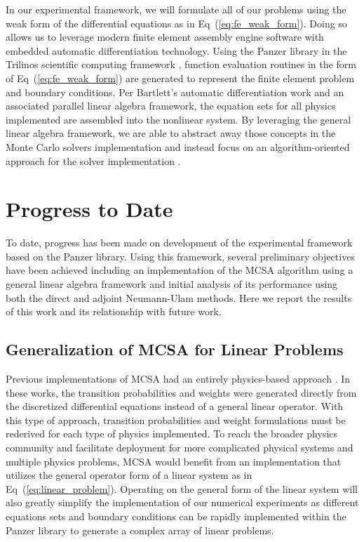 In our experimental framework, we will formulate all of our problems
using the weak form of the differential equations as in
Eq~(\ref{eq:fe_weak_form}). Doing so allows us to leverage modern
finite element assembly engine software with embedded automatic
differentiation technology. Using the Panzer library in the Trilinos
scientific computing framework
\citep{notz_graph-based_2010,heroux_overview_2005}, function
evaluation routines in the form of Eq~(\ref{eq:fe_weak_form}) are
generated to represent the finite element problem and boundary
conditions. Per Bartlett's automatic differentiation work and an
associated parallel linear algebra framework, the equation sets for
all physics implemented are assembled into the nonlinear system. By
leveraging the general linear algebra framework, we are able to
abstract away those concepts in the Monte Carlo solvers implementation
and instead focus on an algorithm-oriented approach for the solver
implementation \citep{musser_algorithm-oriented_1994}.

\section{Progress to Date}
\label{sec:progress}
To date, progress has been made on development of the experimental
framework based on the Panzer library. Using this framework, several
preliminary objectives have been achieved including an implementation
of the MCSA algorithm using a general linear algebra framework and
initial analysis of its performance using both the direct and adjoint
Neumann-Ulam methods. Here we report the results of this work and its
relationship with future work.

\subsection{Generalization of MCSA for Linear Problems}
\label{subsec:mcsa_generalization}
Previous implementations of MCSA had an entirely physics-based
approach \citep{evans_monte_2009,evans_monte_2012}. In these works,
the transition probabilities and weights were generated directly from
the discretized differential equations instead of a general linear
operator. With this type of approach, transition probabilities and
weight formulations must be rederived for each type of physics
implemented. To reach the broader physics community and facilitate
deployment for more complicated physical systems and multiple physics
problems, MCSA would benefit from an implementation that utilizes the
general operator form of a linear system as in
Eq~(\ref{eq:linear_problem}). Operating on the general form of the
linear system will also greatly simplify the implementation of our
numerical experiments as different equations sets and boundary
conditions can be rapidly implemented within the Panzer library to
generate a complex array of linear problems.

